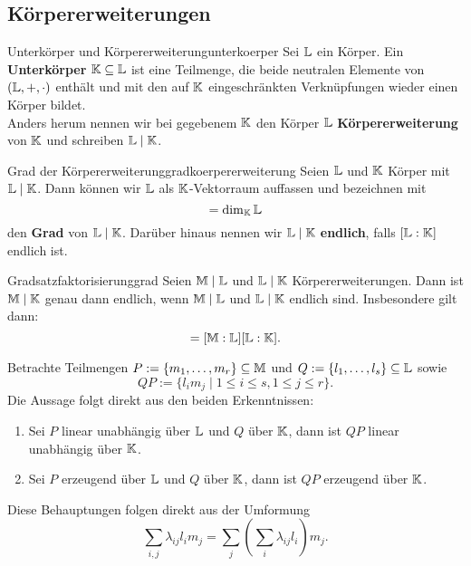 \subsection{Körpererweiterungen}
\label{subsec:koerpererweiterungen}
\begin{definition}{Unterkörper und Körpererweiterung}{unterkoerper}
Sei $\mathbb{L}$ ein Körper. Ein \textbf{Unterkörper} $\mathbb{K} \subseteq \mathbb{L}$ ist eine Teilmenge, die beide neutralen Elemente von $(\mathbb{L}, +, \cdot)$ enthält und mit den auf $\mathbb{K}$ eingeschränkten Verknüpfungen wieder einen Körper bildet.\\
Anders herum nennen wir bei gegebenem $\mathbb{K}$ den Körper $\mathbb{L}$ \textbf{Körpererweiterung} von $\mathbb{K}$ und schreiben $\mathbb{L} \mid \mathbb{K}$.
\end{definition}
\begin{definition}{Grad der Körpererweiterung}{gradkoerpererweiterung}
Seien $\mathbb{L}$ und $\mathbb{K}$ Körper mit $\mathbb{L} \mid \mathbb{K}$. Dann können wir $\mathbb{L}$ als $\mathbb{K}$-Vektorraum auffassen und bezeichnen mit
\begin{equation}
[\L : \K] = \dim_\K \L
\end{equation}
den \textbf{Grad} von $\mathbb{L} \mid \mathbb{K}$. Darüber hinaus nennen wir $\mathbb{L} \mid \mathbb{K}$ \textbf{endlich}, falls $[\mathbb{L} : \mathbb{K}]$ endlich ist.
\end{definition}
\begin{satz}{Gradsatz}{faktorisierunggrad}
Seien $\mathbb{M} \mid \mathbb{L}$ und $\mathbb{L} \mid \mathbb{K}$ Körpererweiterungen. Dann ist $\mathbb{M} \mid \mathbb{K}$ genau dann endlich, wenn $\mathbb{M} \mid \mathbb{L}$ und $\mathbb{L} \mid \mathbb{K}$ endlich sind. Insbesondere gilt dann:
\begin{equation}
[\M : \K] = [\M : \L][\L : \K].
\end{equation}
\end{satz}
\begin{beweis}
Betrachte Teilmengen $P:= \{m_1, \dots, m_r\} \subseteq \mathbb{M}$ und $Q:=\{l_1, \dots, l_s\} \subseteq \mathbb{L}$ sowie
\begin{equation}
QP:=\{l_im_j \mid 1 \leq i \leq s, 1 \leq j \leq r\}.
\end{equation}
Die Aussage folgt direkt aus den beiden Erkenntnissen:
\begin{enumerate}
\item Sei $P$ linear unabhängig über $\mathbb{L}$ und $Q$ über $\mathbb{K}$, dann ist $QP$ linear unabhängig über $\mathbb{K}$.
\item Sei $P$ erzeugend über $\mathbb{L}$ und $Q$ über $\mathbb{K}$, dann ist $QP$ erzeugend über $\mathbb{K}$.
\end{enumerate}
Diese Behauptungen folgen direkt aus der Umformung
\begin{equation}
\sum_{i,j} \lambda_{ij} l_im_j = \sum_j \left( \sum_i \lambda_{ij} l_i \right) m_j.
\end{equation}
\end{beweis}
